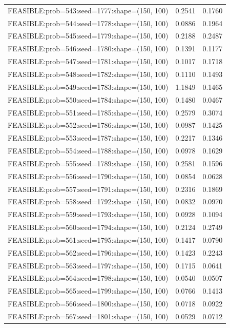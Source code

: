 \begin{longtable}{lcc}
FEASIBLE:prob=543:seed=1777:shape=(150, 100) &   0.2541 & 0.1760 \\
FEASIBLE:prob=544:seed=1778:shape=(150, 100) &   0.0886 & 0.1964 \\
FEASIBLE:prob=545:seed=1779:shape=(150, 100) &   0.2188 & 0.2487 \\
FEASIBLE:prob=546:seed=1780:shape=(150, 100) &   0.1391 & 0.1177 \\
FEASIBLE:prob=547:seed=1781:shape=(150, 100) &   0.1017 & 0.1718 \\
FEASIBLE:prob=548:seed=1782:shape=(150, 100) &   0.1110 & 0.1493 \\
FEASIBLE:prob=549:seed=1783:shape=(150, 100) &   1.1849 & 0.1465 \\
FEASIBLE:prob=550:seed=1784:shape=(150, 100) &   0.1480 & 0.0467 \\
FEASIBLE:prob=551:seed=1785:shape=(150, 100) &   0.2579 & 0.3074 \\
FEASIBLE:prob=552:seed=1786:shape=(150, 100) &   0.0987 & 0.1425 \\
FEASIBLE:prob=553:seed=1787:shape=(150, 100) &   0.2217 & 0.1346 \\
FEASIBLE:prob=554:seed=1788:shape=(150, 100) &   0.0978 & 0.1629 \\
FEASIBLE:prob=555:seed=1789:shape=(150, 100) &   0.2581 & 0.1596 \\
FEASIBLE:prob=556:seed=1790:shape=(150, 100) &   0.0854 & 0.0628 \\
FEASIBLE:prob=557:seed=1791:shape=(150, 100) &   0.2316 & 0.1869 \\
FEASIBLE:prob=558:seed=1792:shape=(150, 100) &   0.0832 & 0.0970 \\
FEASIBLE:prob=559:seed=1793:shape=(150, 100) &   0.0928 & 0.1094 \\
FEASIBLE:prob=560:seed=1794:shape=(150, 100) &   0.2124 & 0.2749 \\
FEASIBLE:prob=561:seed=1795:shape=(150, 100) &   0.1417 & 0.0790 \\
FEASIBLE:prob=562:seed=1796:shape=(150, 100) &   0.1423 & 0.2243 \\
FEASIBLE:prob=563:seed=1797:shape=(150, 100) &   0.1715 & 0.0641 \\
FEASIBLE:prob=564:seed=1798:shape=(150, 100) &   0.0540 & 0.0507 \\
FEASIBLE:prob=565:seed=1799:shape=(150, 100) &   0.0766 & 0.1413 \\
FEASIBLE:prob=566:seed=1800:shape=(150, 100) &   0.0718 & 0.0922 \\
FEASIBLE:prob=567:seed=1801:shape=(150, 100) &   0.0529 & 0.0712 \\

\end{longtable}
